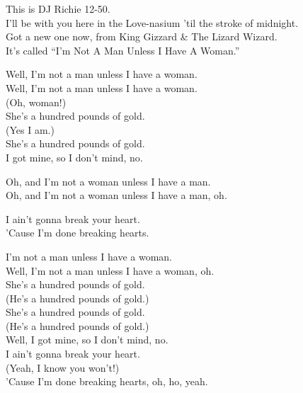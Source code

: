 


This is DJ Richie 12-50. \\
I'll be with you here in the Love-nasium 'til the stroke of midnight. \\
Got a new one now, from King Gizzard \& The Lizard Wizard. \\
It's called ``I'm Not A Man Unless I Have A Woman.'' \\


Well, I'm not a man unless I have a woman. \\
Well, I'm not a man unless I have a woman. \\
(Oh, woman!) \\

She's a hundred pounds of gold. \\
(Yes I am.) \\
She's a hundred pounds of gold. \\
I got mine, so I don't mind, no. \\


Oh, and I'm not a woman unless I have a man. \\
Oh, and I'm not a woman unless I have a man, oh. \\


I ain't gonna break your heart. \\
'Cause I'm done breaking hearts. \\


I'm not a man unless I have a woman. \\
Well, I'm not a man unless I have a woman, oh. \\

She's a hundred pounds of gold. \\
(He's a hundred pounds of gold.) \\
She's a hundred pounds of gold. \\
(He's a hundred pounds of gold.) \\
Well, I got mine, so I don't mind, no. \\

I ain't gonna break your heart. \\
(Yeah, I know you won't!) \\
'Cause I'm done breaking hearts, oh, ho, yeah. \\

